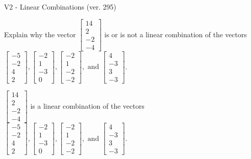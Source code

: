 \begin{exercise}
  \begin{exerciseTitle}V2 - Linear Combinations (ver. 295)\end{exerciseTitle}
  \begin{exerciseStatement}
    Explain why the vector \(\left[\begin{array}{c}
14 \\
2 \\
-2 \\
-4
\end{array}\right]\)  is or is not a linear 
	combination of the vectors \(\left[\begin{array}{c}
-5 \\
-2 \\
4 \\
2
\end{array}\right] , \left[\begin{array}{c}
-2 \\
1 \\
-3 \\
0
\end{array}\right] , \left[\begin{array}{c}
-2 \\
1 \\
-2 \\
-2
\end{array}\right] , \text{ and } \left[\begin{array}{c}
4 \\
-3 \\
3 \\
-3
\end{array}\right]\).
	


  \end{exerciseStatement}
  \begin{exerciseAnswer}
   \(\left[\begin{array}{c}
14 \\
2 \\
-2 \\
-4
\end{array}\right]\) 
  	 is  
	a linear combination of the vectors \(\left[\begin{array}{c}
-5 \\
-2 \\
4 \\
2
\end{array}\right] , \left[\begin{array}{c}
-2 \\
1 \\
-3 \\
0
\end{array}\right] , \left[\begin{array}{c}
-2 \\
1 \\
-2 \\
-2
\end{array}\right] , \text{ and } \left[\begin{array}{c}
4 \\
-3 \\
3 \\
-3
\end{array}\right]\).


\end{exerciseAnswer}
\end{exercise}
